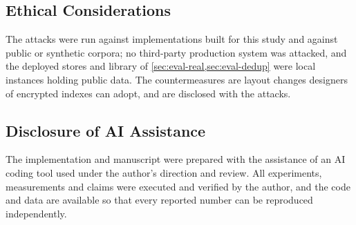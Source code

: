 \subsection{Ethical Considerations}

The attacks were run against implementations built for this study and against public or synthetic
corpora; no third-party production system was attacked, and the deployed stores and library of
\cref{sec:eval-real,sec:eval-dedup} were local instances holding public data. The countermeasures
are layout changes designers of encrypted indexes can adopt, and are disclosed with the attacks.

\subsection{Disclosure of AI Assistance}

The implementation and manuscript were prepared with the assistance of an AI coding tool used under
the author's direction and review. All experiments, measurements and claims were executed and
verified by the author, and the code and data are available so that every reported number can be
reproduced independently.
